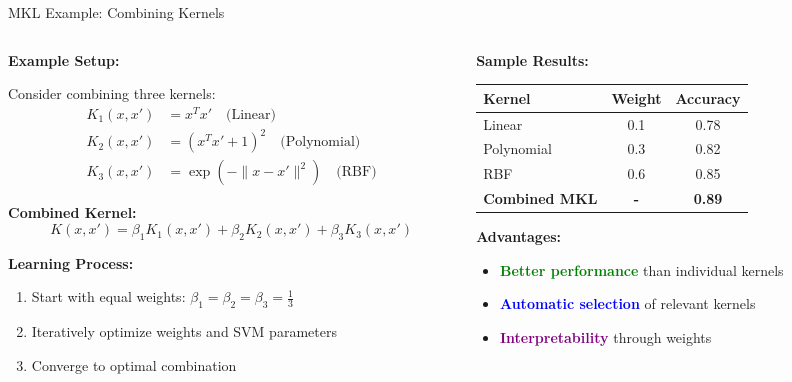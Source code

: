 \documentclass[8pt,aspectratio=1610]{beamer}
\begin{document}
\begin{frame}{MKL Example: Combining Kernels}
\begin{columns}[t]
\begin{column}{0.48\textwidth}
\textbf{Example Setup:}
\vspace{0.2cm}

Consider combining three kernels:
\begin{align}
K_1(x, x') &= x^T x' \quad \text{(Linear)} \\
K_2(x, x') &= (x^T x' + 1)^2 \quad \text{(Polynomial)} \\
K_3(x, x') &= \exp(-\|x-x'\|^2) \quad \text{(RBF)}
\end{align}

\vspace{0.3cm}
\textbf{Combined Kernel:}
$$K(x, x') = \beta_1 K_1(x, x') + \beta_2 K_2(x, x') + \beta_3 K_3(x, x')$$

\vspace{0.3cm}
\textbf{Learning Process:}
\begin{enumerate}
\setlength{\itemsep}{1pt}
\item Start with equal weights: $\beta_1 = \beta_2 = \beta_3 = \frac{1}{3}$
\item Iteratively optimize weights and SVM parameters
\item Converge to optimal combination
\end{enumerate}
\end{column}

\begin{column}{0.48\textwidth}
\textbf{Sample Results:}
\vspace{0.2cm}

\begin{center}
\begin{tabular}{|l|c|c|}
\hline
\textbf{Kernel} & \textbf{Weight} & \textbf{Accuracy} \\
\hline
Linear & 0.1 & 0.78 \\
Polynomial & 0.3 & 0.82 \\
RBF & 0.6 & 0.85 \\
\hline
\textbf{Combined MKL} & \textbf{-} & \textbf{0.89} \\
\hline
\end{tabular}
\end{center}

\vspace{0.3cm}
\textbf{Advantages:}
\begin{itemize}
\setlength{\itemsep}{1pt}
\item \textcolor{green}{\textbf{Better performance}} than individual kernels
\item \textcolor{blue}{\textbf{Automatic selection}} of relevant kernels
\item \textcolor{purple}{\textbf{Interpretability}} through weights
\end{itemize}


\end{column}
\end{columns}
\end{frame}
\end{document}
